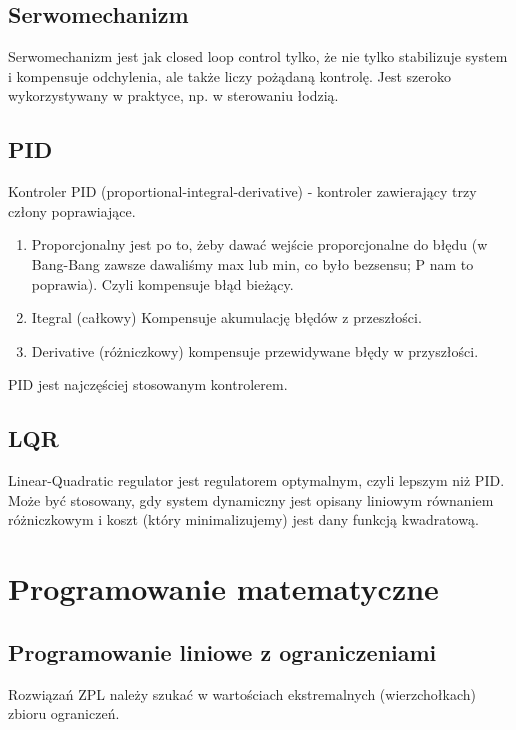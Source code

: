 \documentclass[12pt]{article}
\begin{document}
\subsection{Serwomechanizm}
Serwomechanizm jest jak closed loop control tylko, że nie tylko stabilizuje system i kompensuje odchylenia, ale także liczy pożądaną kontrolę. Jest szeroko wykorzystywany w praktyce, np. w sterowaniu łodzią.

\subsection{PID}
Kontroler PID (proportional-integral-derivative) - kontroler zawierający trzy człony poprawiające. 
\begin{enumerate}
	\item Proporcjonalny jest po to, żeby dawać wejście proporcjonalne do błędu (w Bang-Bang zawsze dawaliśmy max lub min, co było bezsensu; P nam to poprawia). Czyli kompensuje błąd bieżący.
	\item Itegral (całkowy) Kompensuje akumulację błędów z przeszłości.
	\item Derivative (różniczkowy) kompensuje przewidywane błędy w przyszłości.
\end{enumerate}
PID jest najczęściej stosowanym kontrolerem.

\subsection{LQR}
Linear-Quadratic regulator jest regulatorem optymalnym, czyli lepszym niż PID. Może być stosowany, gdy system dynamiczny jest opisany liniowym równaniem różniczkowym i koszt (który minimalizujemy) jest dany funkcją kwadratową.

\section{Programowanie matematyczne}
\subsection{Programowanie liniowe z ograniczeniami}
Rozwiązań ZPL należy szukać w wartościach ekstremalnych (wierzchołkach) zbioru ograniczeń.\\
\end{document}
